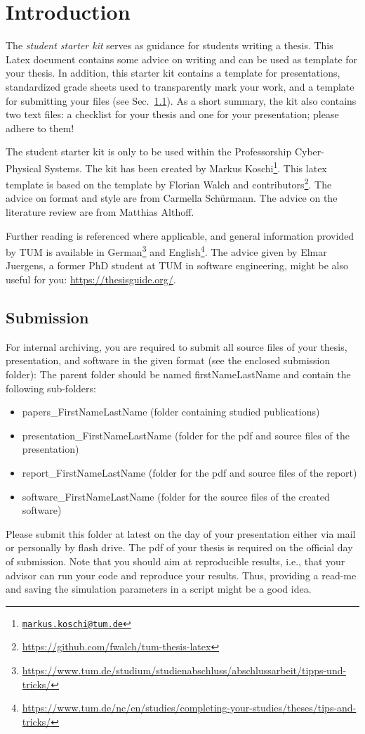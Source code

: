 \chapter{Introduction} \label{ch:intro}

The \textit{student starter kit} serves as guidance for students writing a thesis. This Latex document contains some advice on writing and can be used as template for your thesis. 
In addition, this starter kit contains a template for presentations, standardized grade sheets used to transparently mark your work, and a template for submitting your files (see Sec.~\ref{sec:submission}). As a short summary, the kit also contains two text files: a checklist for your thesis and one for your presentation; please adhere to them!

The student starter kit is only to be used within the Professorship Cyber-Physical Systems. The kit has been created by Markus Koschi\footnote{\href{mailto:markus.koschi@tum.de}{\texttt{markus.koschi@tum.de}}}. This latex template is based on the template by Florian Walch and contributors\footnote{\url{https://github.com/fwalch/tum-thesis-latex}}. The advice on format and style are from Carmella Schürmann. The advice on the literature review are from Matthias Althoff. 

Further reading is referenced where applicable, and general information provided by TUM is available in German\footnote{\url{https://www.tum.de/studium/studienabschluss/abschlussarbeit/tipps-und-tricks/}} and English\footnote{\url{https://www.tum.de/nc/en/studies/completing-your-studies/theses/tips-and-tricks/}}. The advice given by Elmar Juergens, a former PhD student at TUM in software engineering, might be also useful for you: \url{https://thesisguide.org/}.


\section{Submission} \label{sec:submission}
For internal archiving, you are required to submit all source files of your thesis, presentation, and software in the given format (see the enclosed submission folder):
The parent folder should be named firstNameLastName and contain the following sub-folders:
\begin{itemize}
\item papers\_FirstNameLastName (folder containing studied publications)
\item presentation\_FirstNameLastName (folder for the pdf and source files of the presentation)
\item report\_FirstNameLastName (folder for the pdf and source files of the report)
\item software\_FirstNameLastName (folder for the source files of the created software)
\end{itemize}
Please submit this folder at latest on the day of your presentation either via mail or personally by flash drive. The pdf of your thesis is required on the official day of submission. Note that you should aim at reproducible results, i.e., that your advisor can run your code and reproduce your results. Thus, providing a read-me and saving the simulation parameters in a script might be a good idea.

